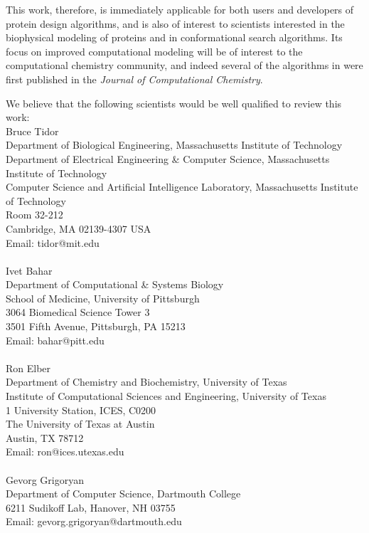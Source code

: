 \documentclass[11pt, oneside]{article}   	%
\def\osprey{{\sc{osprey}}\xspace}
\begin{document}
This work, therefore, is immediately applicable for both users and developers of protein design algorithms, and is also of interest to scientists interested in the biophysical modeling of proteins and in conformational search algorithms.  Its focus on improved computational modeling will be of interest to the computational chemistry community, and indeed several of the algorithms in \osprey were first published in the {\em Journal of Computational Chemistry}.  

\bigskip
We believe that the following scientists would be well qualified to review this work:
\\

\hspace{-0.285in} Bruce Tidor \\Department of Biological Engineering, Massachusetts Institute of Technology \\Department of Electrical Engineering \& Computer Science, Massachusetts Institute of Technology \\Computer Science and Artificial Intelligence Laboratory, Massachusetts Institute of Technology \\Room 32-212 \\Cambridge, MA 02139-4307 USA \\Email: tidor@mit.edu \\
 \\\hspace{-0.285in} Ivet Bahar \\Department of Computational \& Systems Biology \\School of Medicine, University of Pittsburgh \\3064 Biomedical Science Tower 3 \\3501 Fifth Avenue, Pittsburgh, PA 15213 \\Email: bahar@pitt.edu \\
  \\\hspace{-0.285in} Ron Elber \\Department of Chemistry and Biochemistry, University of Texas \\Institute of Computational Sciences and Engineering, University of Texas \\1 University Station, ICES, C0200 \\The University of Texas at Austin \\Austin, TX 78712 \\Email: ron@ices.utexas.edu \\
     \\\hspace{-0.285in} Gevorg Grigoryan \\Department of Computer Science, Dartmouth College \\6211 Sudikoff Lab, Hanover, NH 03755 \\Email: gevorg.grigoryan@dartmouth.edu \\
\end{document}
